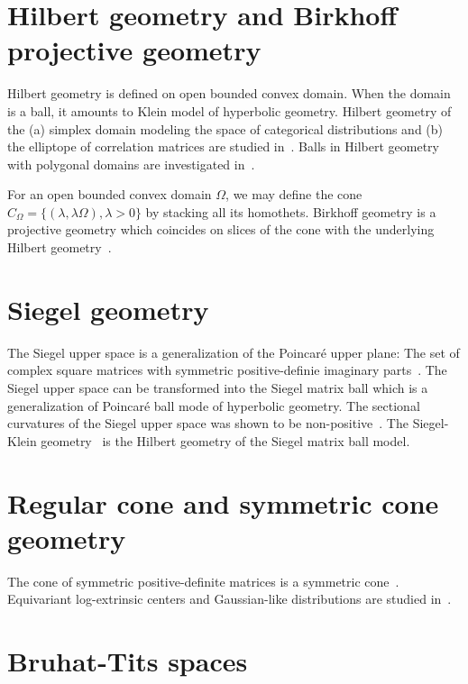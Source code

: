 \documentclass[11pt]{article}
\begin{document}
\section*{Hilbert geometry and Birkhoff projective geometry}

Hilbert geometry is defined on open bounded convex domain. When the domain is a ball, it amounts to Klein model of hyperbolic geometry.
Hilbert geometry of the (a) simplex domain modeling the space of categorical distributions and (b) the elliptope of correlation matrices are studied in~\cite{nielsen2019clustering,nielsen2023non}. 
Balls in Hilbert geometry with polygonal domains are investigated in~\cite{nielsen2017balls}.

For an open bounded convex domain $\Omega$, we may define the cone $C_\Omega=\{(\lambda,\lambda\Omega), \lambda>0\}$ by stacking all its homothets. Birkhoff geometry is a projective geometry which coincides on slices of the cone with the underlying Hilbert geometry~\cite{nielsen2023fisher}.


 
\section*{Siegel geometry}

The Siegel upper space is a generalization of the Poincar\'e upper plane: The set of complex square matrices with symmetric positive-definie imaginary parts~\cite{nielsen2013matrix}. The Siegel upper space can be transformed into the Siegel matrix ball which is a generalization of Poincar\'e ball mode of hyperbolic geometry.
The sectional curvatures of the Siegel upper space was shown to be non-positive~\cite{cabanes2021classification}.
The Siegel-Klein geometry~\cite{nielsen2020siegel} is the Hilbert geometry of the Siegel matrix ball model.

\section*{Regular cone and symmetric cone geometry}

The cone of symmetric positive-definite matrices is a symmetric cone~\cite{nielsen2023fisher}.
Equivariant log-extrinsic centers and Gaussian-like distributions are studied in~\cite{chevallier2024equivariant}.


\section*{Bruhat-Tits spaces}
\end{document}
